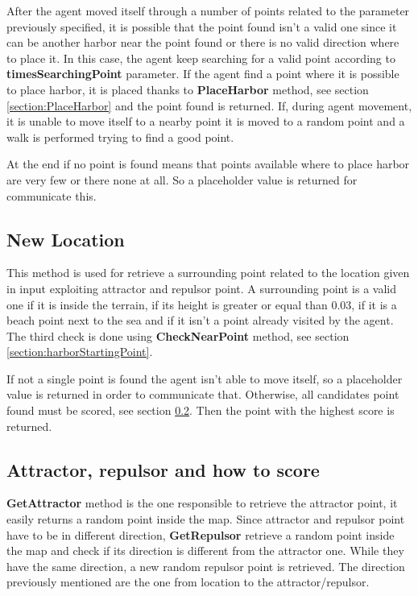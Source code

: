 \documentclass[12pt]{article}
\begin{document}
    After the agent moved itself through a number of points related to the parameter previously specified, it is possible that the point found isn't a valid one since it can be another
    harbor near the point found or there is no valid direction where to place it. In this case, the agent keep searching for a valid point according to \textbf{timesSearchingPoint}
    parameter. If the agent find a point where it is possible to place harbor, it is placed thanks to \textbf{PlaceHarbor} method, see section \ref{section:PlaceHarbor} and the 
    point found is returned. If, during agent movement, it is unable to move itself to a nearby point it is moved to a random point and a walk is performed trying to find a 
    good point. 

    At the end if no point is found means that points available where to place harbor are very few or there none at all. So a placeholder value is returned for communicate this.

    \subsection{New Location} \label{section:HarborNewLocation}
    This method is used for retrieve a surrounding point related to the location given in input exploiting attractor and repulsor point. A surrounding point is a valid one if
    it is inside the terrain, if its height is greater or equal than 0.03, if it is a beach point next to the sea and if it isn't a point already visited by the agent.
    The third check is done using \textbf{CheckNearPoint} method, see section \ref{section:harborStartingPoint}. 

    If not a single point is found the agent isn't able to move itself, so a placeholder value is returned in order to communicate that. Otherwise, all candidates point found must
    be scored, see section \ref{section:attractor}. Then the point with the highest score is returned.

    \subsection{Attractor, repulsor and how to score} \label{section:attractor}
    \textbf{GetAttractor} method is the one responsible to retrieve the attractor point, it easily returns a random point inside the map. Since attractor and repulsor point
    have to be in different direction, \textbf{GetRepulsor} retrieve a random point inside the map and check if its direction is different from the attractor one. While they have 
    the same direction, a new random repulsor point is retrieved. The direction previously mentioned are the one from location to the attractor/repulsor.
\end{document}
